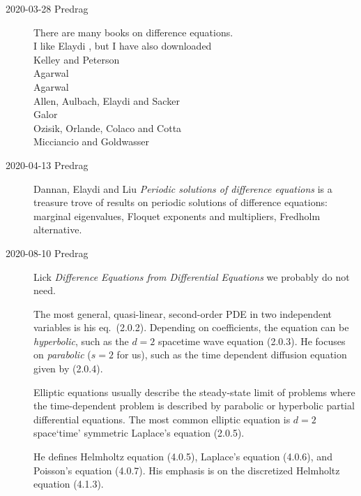\bigskip

\begin{description}
\item[2020-03-28 Predrag]
There are many books on difference equations. \\
I like
Elaydi , but I have also downloaded\\
Kelley and Peterson \\
Agarwal \\
Agarwal \\
Allen, Aulbach, Elaydi and Sacker \\
Galor \\
Ozisik, Orlande, Colaco and Cotta \\
Micciancio and Goldwasser\\

\item[2020-04-13 Predrag]
Dannan, Elaydi and Liu
{\em Periodic solutions of difference equations}
is a treasure trove of results on periodic solutions of difference equations:
marginal eigenvalues, Floquet exponents and multipliers,
Fredholm alternative.

    \item[2020-08-10 Predrag]
Lick {\em Difference Equations from Differential Equations}
 we probably do not need.

The most general, quasi-linear, second-order PDE in two independent
variables is his eq.~(2.0.2). Depending on coefficients, the equation can
be \emph{hyperbolic}, such as the $d=2$ spacetime wave equation (2.0.3).
He focuses on \emph{parabolic} (${s}=2$ for us), such as the time
dependent diffusion equation given by (2.0.4).

Elliptic equations usually describe the steady-state limit of problems
where the time-dependent problem is described by parabolic or hyperbolic
partial differential equations. The most common elliptic equation is
$d=2$ space`time' symmetric Laplace's equation (2.0.5).

He defines Helmholtz equation (4.0.5),
 Laplace's equation (4.0.6), and Poisson's equation (4.0.7).
 His emphasis is on the discretized Helmholtz equation (4.1.3).


\end{description}
